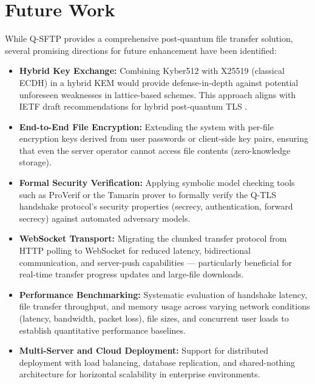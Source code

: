 \chapter{Future Work}
\label{chap.8}

While Q-SFTP provides a comprehensive post-quantum file transfer solution, several promising directions for future enhancement have been identified:

\begin{itemize}
    \item \textbf{Hybrid Key Exchange:} Combining Kyber512 with X25519 (classical ECDH) in a hybrid KEM would provide defense-in-depth against potential unforeseen weaknesses in lattice-based schemes. This approach aligns with IETF draft recommendations for hybrid post-quantum TLS \cite{chen2022hybridtls}.
    
    \item \textbf{End-to-End File Encryption:} Extending the system with per-file encryption keys derived from user passwords or client-side key pairs, ensuring that even the server operator cannot access file contents (zero-knowledge storage).
    
    \item \textbf{Formal Security Verification:} Applying symbolic model checking tools such as ProVerif or the Tamarin prover to formally verify the Q-TLS handshake protocol's security properties (secrecy, authentication, forward secrecy) against automated adversary models.
    
    \item \textbf{WebSocket Transport:} Migrating the chunked transfer protocol from HTTP polling to WebSocket for reduced latency, bidirectional communication, and server-push capabilities — particularly beneficial for real-time transfer progress updates and large-file downloads.
    
    \item \textbf{Performance Benchmarking:} Systematic evaluation of handshake latency, file transfer throughput, and memory usage across varying network conditions (latency, bandwidth, packet loss), file sizes, and concurrent user loads to establish quantitative performance baselines.
    
    \item \textbf{Multi-Server and Cloud Deployment:} Support for distributed deployment with load balancing, database replication, and shared-nothing architecture for horizontal scalability in enterprise environments.
    

\end{itemize}
